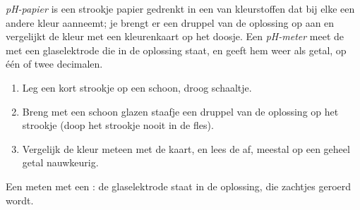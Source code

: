 \begin{definition}\label{def:g9:acids-bases-ph:ph-paper}
\emph{pH-papier} is een strookje papier gedrenkt in een
 van kleurstoffen dat bij elke  een andere kleur aanneemt; je
brengt er een druppel van de oplossing op aan en vergelijkt de kleur met
een kleurenkaart op het doosje. Een \emph{pH-meter} meet
de  met een glaselektrode die in de oplossing staat, en geeft hem weer
als getal, op één of twee decimalen.
\end{definition}

\begin{method}\label{met:g9:acids-bases-ph:paper}
\begin{enumerate}
  \item Leg een kort strookje  op een schoon, droog schaaltje.
  \item Breng met een schoon glazen staafje een druppel van de oplossing
        op het strookje (doop het strookje nooit in de fles).
  \item Vergelijk de kleur meteen met de kaart, en lees de  af, meestal
        op een geheel getal nauwkeurig.
\end{enumerate}
\end{method}

\begin{omfigure}

{\small Een  meten met een : de glaselektrode staat in de
oplossing, die zachtjes geroerd wordt.}
\end{omfigure}

